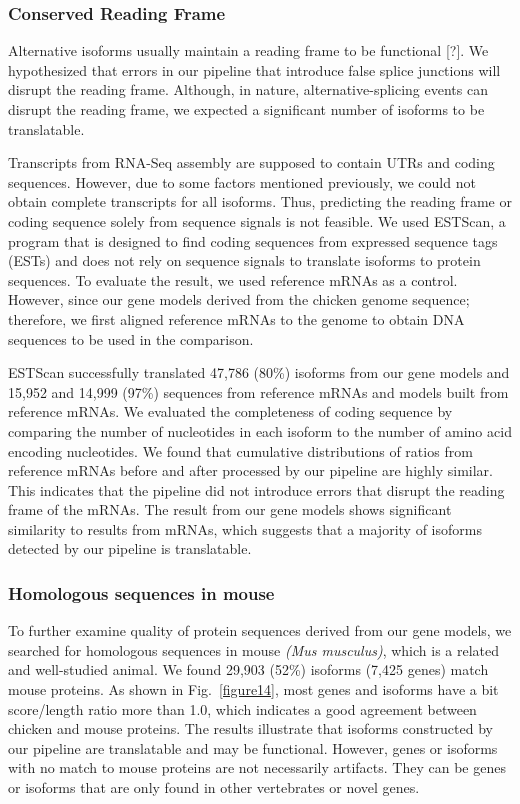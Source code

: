 \documentclass[10pt]{article}
\begin{document}
\subsubsection*{Conserved Reading Frame}
Alternative isoforms usually maintain a reading frame to be functional [?].
We hypothesized that errors in our pipeline that introduce false splice junctions will disrupt the reading frame.
Although, in nature, alternative-splicing events can disrupt the reading frame, we expected a significant number of isoforms to be translatable. 

Transcripts from RNA-Seq assembly are supposed to contain UTRs and coding sequences. However, due to some factors mentioned previously, we could not obtain complete transcripts for all isoforms.
Thus, predicting the reading frame or coding sequence solely from sequence signals is not feasible.
We used ESTScan\cite{Iseli:1999vd}, a program that is designed to find coding sequences from expressed sequence tags (ESTs) and does not rely on sequence signals to translate isoforms to protein sequences.
To evaluate the result, we used reference mRNAs as a control.
However, since our gene models derived from the chicken genome sequence; therefore, we first aligned reference mRNAs to the genome to obtain DNA sequences to be used in the comparison.

ESTScan successfully translated 47,786 (80\%) isoforms from our gene models and 15,952 and 14,999 (97\%) sequences from reference mRNAs and models built from reference mRNAs.
We evaluated the completeness of coding sequence by comparing the number of nucleotides in each isoform to the number of amino acid encoding nucleotides.
We found that cumulative distributions of ratios from reference mRNAs before and after processed by our pipeline are highly similar.
This indicates that the pipeline did not introduce errors that disrupt the reading frame of the mRNAs.
The result from our gene models shows significant similarity to results from mRNAs, which suggests that a majority of isoforms detected by our pipeline is translatable.

\subsubsection*{Homologous sequences in mouse}
To further examine quality of protein sequences derived from our gene models, we searched for homologous sequences in mouse \textit{(Mus musculus)}, which is a related and well-studied animal.
We found 29,903 (52\%) isoforms (7,425 genes) match mouse proteins.
As shown in Fig.~\ref{figure14}, most genes and isoforms have a bit score/length ratio more than 1.0, which indicates a good agreement between chicken and mouse proteins.
The results illustrate that isoforms constructed by our pipeline are translatable and may be functional.
However, genes or isoforms with no match to mouse proteins are not necessarily artifacts.
They can be genes or isoforms that are only found in other vertebrates or novel genes.
\end{document}
